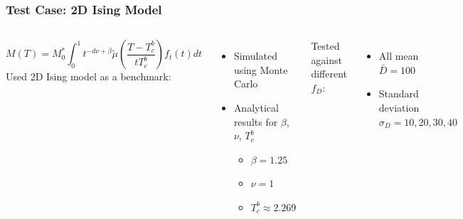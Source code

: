 \documentclass{beamer}
\begin{document}
\begin{frame}
	\frametitle{Test Case: 2D Ising Model}
	\begin{columns}
	\column{7cm}
		\small{
		$$
		M(T) = M_0^*\int_0^1 t^{-d\nu +\beta} \tilde{\mu}\left(\frac{T-T_c^b}{tT_c^b}\right) f_t(t) dt
		$$}
		Used 2D Ising model as a benchmark:
		\begin{itemize}
			\item{Simulated using Monte Carlo}
			\item{Analytical results for $\beta$, $\nu$, $T_c^b$}
			\begin{itemize}
				\item{$\beta = 1.25$}
				\item{$\nu=1$}
				\item{$T_c^b \approx 2.269$}
			\end{itemize}
		\end{itemize} \vspace{4mm}

		Tested against different $f_D$:
		\begin{itemize}
			\item{All mean $\bar{D}=100$}
			\item{Standard deviation $\sigma_D=10, 20, 30 ,40$}
		\end{itemize}
	\column{5cm}
		\includegraphics[width=4.5cm]{Images/distros}

		\includegraphics[width=4.5cm]{Images/unconst}
	\end{columns}
\end{frame}
\end{document}
